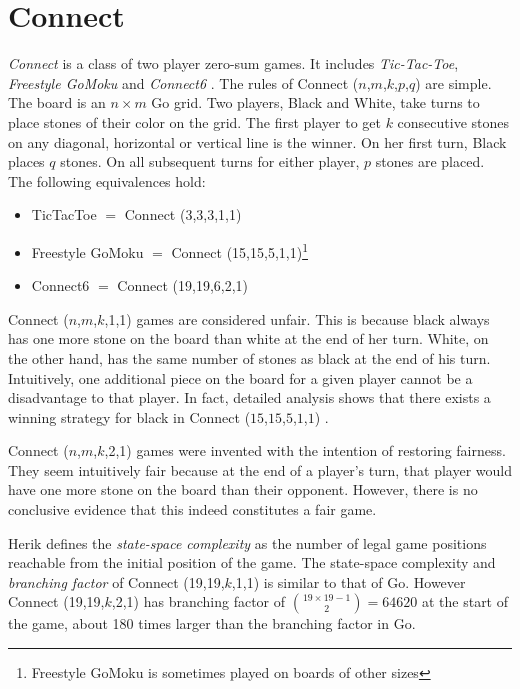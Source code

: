\section{Connect\label{sec:introconnect}}
\textit{Connect} is a class of two player zero-sum games. It includes \textit{Tic-Tac-Toe}, \textit{Freestyle GoMoku} and \textit{Connect6} \cite{connect6}. The rules of {Connect} ($n$,$m$,$k$,$p$,$q$) are simple. The board is an $n\times m$ {Go} grid. Two players, {Black} and {White}, take turns to place stones of their color on the grid. The first player to get $k$ consecutive stones on any diagonal, horizontal or vertical line is the winner. On her first turn, {Black} places $q$ stones. On all subsequent turns for either player, $p$ stones are placed. The following equivalences hold:
\begin{itemize}
\item[]{TicTacToe} $=$ {Connect} (3,3,3,1,1) \item[]{Freestyle GoMoku} $=$ {Connect} (15,15,5,1,1)\footnote{{Freestyle GoMoku} is sometimes played on boards of other sizes}
\item[]{Connect6} $=$ {Connect} (19,19,6,2,1)
\end{itemize}
{Connect} ($n$,$m$,$k$,1,1) games are considered unfair. This is because black always has one more stone on the board than white at the end of her turn. White, on the other hand, has the same number of stones as black at the end of his turn. Intuitively, one additional piece on the board for a given player cannot be a disadvantage to that player. In fact, detailed analysis shows that there exists a winning strategy for black in {Connect} ($15$,$15$,$5$,$1$,$1$) \cite{gomoku,solvedgames}. 

{Connect} ($n$,$m$,$k$,2,1) games were invented with the intention of restoring fairness. They seem intuitively fair because at the end of a player's turn, that player would have one more stone on the board than their opponent. However, there is no conclusive evidence that this indeed constitutes a fair game.

Herik \cite{solvedgames} defines the \textit{state-space complexity} as the number of legal game positions reachable
from the initial position of the game. The {state-space complexity} and \textit{branching factor} of {Connect} (19,19,$k$,1,1) is similar to that of {Go}. However {Connect} (19,19,$k$,2,1) has {branching factor} of $\binom{19 \times 19 -1}{2} = 64620$ at the start of the game, about 180 times larger than the branching factor in {Go}.


